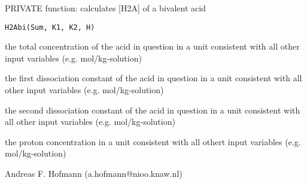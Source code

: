 \documentclass{article}
\begin{document}
\begin{Description}\relax
PRIVATE function: calculates [H2A] of a bivalent acid
\end{Description}
\begin{Usage}
\begin{verbatim}H2Abi(Sum, K1, K2, H)\end{verbatim}
\end{Usage}
\begin{Arguments}
\begin{ldescription}
\item[\code{Sum }] the total concentration of the acid in question in a unit consistent with all other input variables (e.g. mol/kg-solution)
\item[\code{K1 }] the first dissociation constant of the acid in question in a unit consistent with all other input variables (e.g. mol/kg-solution)
\item[\code{K2 }] the second dissociation constant of the acid in question in a unit consistent with all other input variables (e.g. mol/kg-solution)
\item[\code{H }] the proton concentration in a unit consistent with all othert input variables (e.g. mol/kg-solution)
\end{ldescription}
\end{Arguments}
\begin{Author}\relax
Andreas F. Hofmann (a.hofmann@nioo.knaw.nl)
\end{Author}
\end{document}
